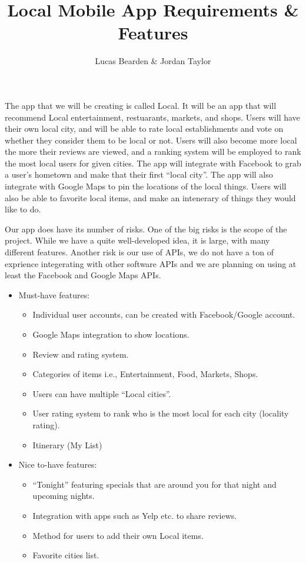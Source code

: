 \documentclass[11pt, oneside]{article}
\title{Local Mobile App Requirements & Features}
\author{Lucas Bearden & Jordan Taylor}
\begin{document}
\maketitle
The app that we will be creating is called Local. It will be an app that will recommend Local entertainment, restuarants, markets, and shops. Users will have their own local city, and will be able to rate local establishments and vote on whether they consider them to be local or not. Users will also become more local the more their reviews are viewed, and a ranking system will be employed to rank the most local users for given cities. The app will integrate with Facebook to grab a user's hometown and make that their first ``local city''. The app will also integrate with Google Maps to pin the locations of the local things. Users will also be able to favorite local items, and make an intenerary of things they would like to do. 

Our app does have its number of risks. One of the big risks is the scope of the project. While we have a quite well-developed idea, it is large, with many different features. Another risk is our use of APIs, we do not have a ton of exprience integerating with other software APIs and we are planning on using at least the Facebook and Google Maps APIs.
\begin{itemize}
   \item Must-have features:
       \begin{itemize}
          \item Individual user accounts, can be created with Facebook/Google account.
          \item Google Maps integration to show locations.
          \item Review and rating system.
          \item Categories of items i.e., Entertainment, Food, Markets, Shops.
          \item Users can have multiple ``Local cities''.
          \item User rating system to rank who is the most local for each city (locality rating).
          \item Itinerary (My List)
       \end{itemize}  
   \item Nice to-have features:
       \begin{itemize}
          \item ``Tonight'' featuring specials that are around you for that night and upcoming nights.
          \item Integration with apps such as Yelp etc. to share reviews.
          \item Method for users to add their own Local items.
          \item Favorite cities list.
       \end{itemize}
  \end{itemize}
\end{document}
